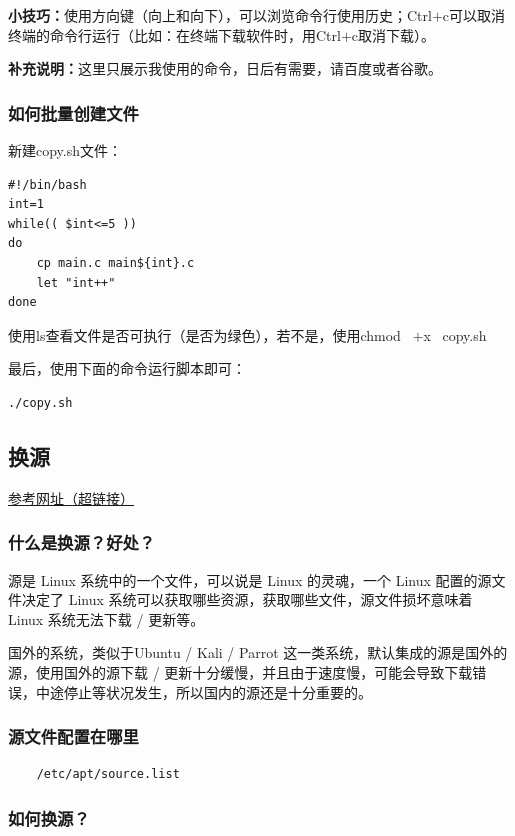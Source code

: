 \documentclass[12pt]{article}
\begin{document}
\textbf{小技巧：}使用方向键（向上和向下），可以浏览命令行使用历史；Ctrl\(+\)c可以取消终端的命令行运行（比如：在终端下载软件时，用Ctrl\(+\)c取消下载）。

\textbf{补充说明：}这里只展示我使用的命令，日后有需要，请百度或者谷歌。

\subsubsection{如何批量创建文件}



\noindent 新建copy.sh文件：
\begin{verbatim}
#!/bin/bash
int=1
while(( $int<=5 ))
do
    cp main.c main${int}.c
    let "int++"
done
\end{verbatim}

\noindent 使用ls查看文件是否可执行（是否为绿色），若不是，使用chmod~ \(+\)x ~copy.sh

\noindent 最后，使用下面的命令运行脚本即可：
\begin{verbatim}
./copy.sh
\end{verbatim}
\subsection{换源}


\href{https://blog.csdn.net/qq_40520596/article/details/110194439}{参考网址（超链接）}

\subsubsection{什么是换源？好处？}
源是 Linux 系统中的一个文件，可以说是 Linux 的灵魂，一个 Linux 配置的源文件决定了 Linux 系统可以获取哪些资源，获取哪些文件，源文件损坏意味着 Linux 系统无法下载 / 更新等。

国外的系统，类似于Ubuntu / Kali / Parrot 这一类系统，默认集成的源是国外的源，使用国外的源下载 / 更新十分缓慢，并且由于速度慢，可能会导致下载错误，中途停止等状况发生，所以国内的源还是十分重要的。
\subsubsection{源文件配置在哪里}
\begin{verbatim}
    /etc/apt/source.list
\end{verbatim}

\subsubsection{如何换源？}
\end{document}
